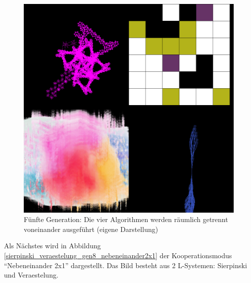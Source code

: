 \documentclass[../mciAusarbeitung.tex]{subfiles}
\begin{document}
\begin{figure}[H]
\includegraphics[width=\linewidth]{img/l_gol_p_l_gen5_nebeneinander.png}
\caption[Räumliche Trennung]{Fünfte Generation: Die vier Algorithmen werden räumlich getrennt voneinander ausgeführt (eigene Darstellung)}
\label{l_gol_p_l_gen5_nebeneinander}
\end{figure}

Als Nächstes wird in Abbildung \ref{sierpinski_veraestelung_gen8_nebeneinander2x1} der Kooperationsmodus "`Nebeneinander 2x1"' dargestellt. Das Bild besteht aus 2 L-Systemen: Sierpinski und Veraestelung.
\end{document}
